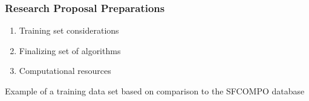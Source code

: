 
\begin{frame}
  \frametitle{Research Proposal Preparations}
  \begin{minipage}{0.38\textwidth}
    \begin{enumerate}
      \item Training set considerations
      \item Finalizing set of algorithms
      \item Computational resources
    \end{enumerate}
  \end{minipage}\hfill
  \begin{minipage}{0.55\textwidth}
    \raggedright
    \begin{table}
      \caption{Example of a training data set based on comparison to the SFCOMPO database \cite{jones_viz_2014, sfcompo}}
    \end{table}
  \end{minipage}
\end{frame}

